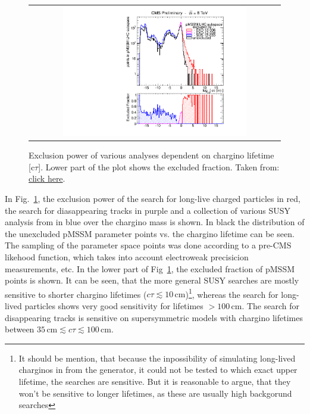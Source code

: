 \begin{figure}[!t]
  \centering 
  \begin{tabular}{c}
    \includegraphics[width=0.75\textwidth]{figures/analysis/pMSSM_vs_ctau.pdf}
  \end{tabular}
  \caption{Exclusion power of various analyses dependent on chargino lifetime [c$\tau$]. Lower part of the plot shows the excluded fraction. Taken from: \href{https://twiki.cern.ch/twiki/bin/view/CMSPublic/PhysicsResultsEXO12034}{click here}.}
  \label{fig:pMSSMplot}
\end{figure}
In Fig.~\ref{fig:pMSSMplot}, the exclusion power of the search for long-live charged particles \cite{bib:CMS:HSCP_8TeV} in red, the search for diasappearing tracks \cite{bib:CMS:DT_8TeV} in purple and a collection of various SUSY analysis from \cite{bib:CMS:pMSSMinterpretation_7TeV_PAS} in blue over the chargino mass is shown. 
In black the distribution of the unexcluded pMSSM parameter points vs. the chargino lifetime can be seen.
The sampling of the parameter space points was done according to a pre-CMS likehood function, which takes into account electroweak precisicion measurements, etc.
In the lower part of Fig~\ref{fig:pMSSMplot}, the excluded fraction of pMSSM points is shown. 
It can be seen, that the more general SUSY searches are mostly sensitive to shorter chargino lifetimes ($c\tau \lesssim 10 \,\text{cm}$)\footnote{It should be mention, that because the inpossibility of simulating long-lived charginos in from the generator, it could not be tested to which exact upper lifetime, the searches are sensitive. But it is reasonable to argue, that they won't be sensitive to longer lifetimes, as these are usually high backgorund searches}, whereas the search for long-lived particles shows very good sensitivity for lifetimes $>100\,$cm.
The search for disappearing tracks is sensitive on supersymmetric models with chargino lifetimes between $35\,\text{cm} \lesssim c\tau \lesssim 100\,\text{cm}$.

